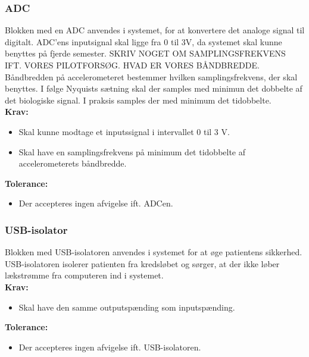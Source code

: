 \subsubsection{ADC}
Blokken med en ADC anvendes i systemet, for at konvertere det analoge signal til digitalt. %
ADC'ens inputsignal skal ligge fra 0 til 3V, da systemet skal kunne benyttes på fjerde semester. %
SKRIV NOGET OM SAMPLINGSFREKVENS IFT. VORES PILOTFORSØG. HVAD ER VORES BÅNDBREDDE. Båndbredden på accelerometeret bestemmer hvilken samplingsfrekvens, der skal benyttes. I følge Nyquists sætning skal der samples med minimun det dobbelte af det biologiske signal. I praksis samples der med minimum det tidobbelte. \\
\textbf{Krav:}
\begin{itemize}
\item Skal kunne modtage et inputssignal i intervallet 0 til 3 V.
\item Skal have en samplingsfrekvens på minimum det tidobbelte af accelerometerets båndbredde.
\end{itemize}
\textbf{Tolerance:}
\begin{itemize}
\item Der accepteres ingen afvigelse ift. ADCen.
\end{itemize}
\subsubsection{USB-isolator}
Blokken med USB-isolatoren anvendes i systemet for at øge patientens sikkerhed. USB-isolatoren isolerer patienten fra kredsløbet og sørger, at der ikke løber lækstrømme fra computeren ind i systemet.\\
\textbf{Krav:}
\begin{itemize}
\item Skal have den samme outputspænding som inputspænding. 
\end{itemize}
\textbf{Tolerance:}
\begin{itemize}
\item Der accepteres ingen afvigelse ift. USB-isolatoren. 
\end{itemize}
